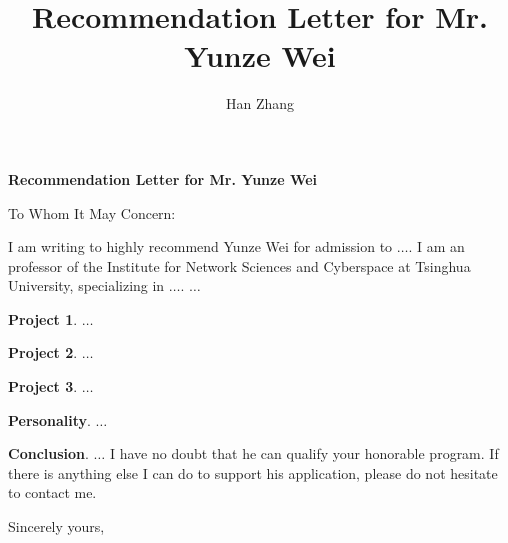 \documentclass[a4paper]{letter}
\title{\bf Recommendation Letter for Mr. Yunze Wei}
\author{Han Zhang}
\begin{document}
\begin{letter}{\bf Recommendation Letter for Mr. Yunze Wei}
\opening{To Whom It May Concern:}

I am writing to highly recommend Yunze Wei for admission to $\hdots$. I am an professor of the Institute for Network Sciences and Cyberspace at Tsinghua University, specializing in $\hdots$. $\hdots$

\textbf{Project 1}. $\hdots$

\textbf{Project 2}. $\hdots$

\textbf{Project 3}. $\hdots$

\textbf{Personality}. $\hdots$

\textbf{Conclusion}. $\hdots$ I have no doubt that he can qualify your honorable program. If there is anything else I can do to support his application, please do not hesitate to contact me.


\closing{Sincerely yours,\\
\fromsig{%
}
}

\end{letter}
\end{document}
